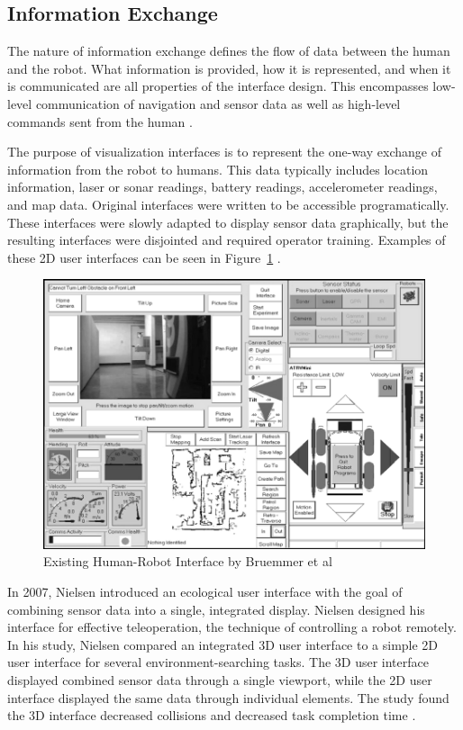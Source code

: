 \subsection{Information Exchange}
\label{sub:info_exchange}
The nature of information exchange defines the flow of data between the human and the robot. What information is provided, how it is represented, and when it is communicated are all properties of the interface design. This encompasses low-level communication of navigation and sensor data as well as high-level commands sent from the human \cite{Goodrich_Survey}. 

The purpose of visualization interfaces is to represent the one-way exchange of information from the robot to humans. This data typically includes location information, laser or sonar readings, battery readings, accelerometer readings, and map data. Original interfaces were written to be accessible programatically. These interfaces were slowly adapted to display sensor data graphically, but the resulting interfaces were disjointed and required operator training. Examples of these 2D user interfaces can be seen in Figure~\ref{fig:prior-hri} \cite{Bruemmer}.

\begin{figure}[ht]
\begin{center}
\includegraphics[width=5in]{images/prior-hri.png}
\caption{Existing Human-Robot Interface by Bruemmer et al
\label{fig:prior-hri}}
\end{center}
\end{figure}

In 2007, Nielsen introduced an ecological user interface with the goal of combining sensor data into a single, integrated display. Nielsen designed his interface for effective teleoperation, the technique of controlling a robot remotely. In his study, Nielsen compared an integrated 3D user interface to a simple 2D user interface for several environment-searching tasks. The 3D user interface displayed combined sensor data through a single viewport, while the 2D user interface displayed the same data through individual elements. The study found the 3D interface decreased collisions and decreased task completion time \cite{Nielsen_Teleoperation}.


